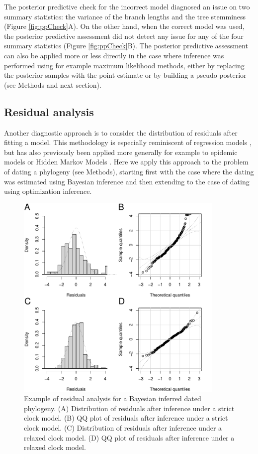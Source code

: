 \documentclass{article}
\begin{document}
The posterior predictive check for the incorrect model diagnosed an issue on
two summary statistics: the variance of the branch lengths and the tree 
stemminess (Figure \ref{fig:ppCheck}A). On the other hand, when the correct model was
used, the posterior predictive assessment did not detect any issue for any of the four
summary statistics (Figure \ref{fig:ppCheck}B). 
The posterior predictive assessment can also be applied more or less directly in the 
case where inference was performed using for example maximum likelihood methods,
either by replacing the posterior samples with the point estimate or by building a
pseudo-posterior (see Methods and next section). 

\subsection*{Residual analysis}

Another diagnostic approach is to consider the distribution of residuals after fitting a model.
This methodology is especially reminiscent of regression models
\citep{coxGeneralDefinitionResiduals1968,dunnRandomizedQuantileResiduals1996},
but has also previously been applied more generally for example to
epidemic models \citep{lauNewModelDiagnostics2014} or 
Hidden Markov Models \citep{zucchini2009hidden,buckbyModelCheckingHidden2020}.
Here we apply this approach to the problem of dating a phylogeny (see Methods), starting first with the case
where the dating was estimated using Bayesian inference and then extending to the case of 
dating using optimization inference. 

\begin{figure}[p!]
\begin{center}
\includegraphics[width=10cm]{exampleResid.pdf}
\end{center}
\caption{Example of residual analysis for a Bayesian inferred dated phylogeny.
(A) Distribution of residuals after inference under a strict clock model. 
(B) QQ plot of residuals after inference under a strict clock model.
(C) Distribution of residuals after inference under a relaxed clock model. 
(D) QQ plot of residuals after inference under a relaxed clock model.
\label{fig:exampleResid}}
\end{figure}
\end{document}
